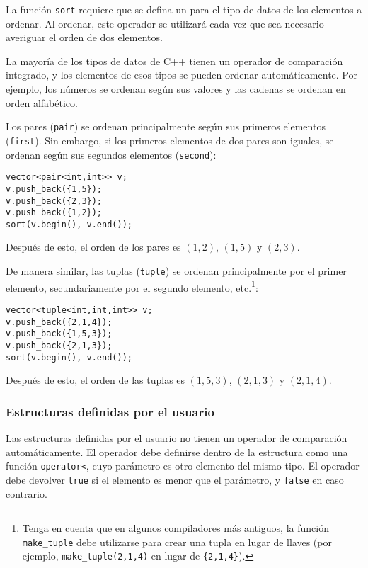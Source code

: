 
La función \texttt{sort} requiere que
se defina un  para el tipo de datos
de los elementos a ordenar.
Al ordenar, este operador se utilizará
cada vez que sea necesario averiguar el orden de dos elementos.

La mayoría de los tipos de datos de C++ tienen un operador de comparación integrado,
y los elementos de esos tipos se pueden ordenar automáticamente.
Por ejemplo, los números se ordenan según sus valores
y las cadenas se ordenan en orden alfabético.


Los pares (\texttt{pair}) se ordenan principalmente según sus
primeros elementos (\texttt{first}).
Sin embargo, si los primeros elementos de dos pares son iguales,
se ordenan según sus segundos elementos (\texttt{second}):
\begin{lstlisting}
vector<pair<int,int>> v;
v.push_back({1,5});
v.push_back({2,3});
v.push_back({1,2});
sort(v.begin(), v.end());
\end{lstlisting}
Después de esto, el orden de los pares es
$(1,2)$, $(1,5)$ y $(2,3)$.


De manera similar, las tuplas (\texttt{tuple})
se ordenan principalmente por el primer elemento,
secundariamente por el segundo elemento, etc.\footnote{Tenga en cuenta que en algunos compiladores más antiguos,
la función \texttt{make\_tuple} debe utilizarse para crear una tupla en lugar de
llaves (por ejemplo, \texttt{make\_tuple(2,1,4)} en lugar de \texttt{\{2,1,4\}}).}:
\begin{lstlisting}
vector<tuple<int,int,int>> v;
v.push_back({2,1,4});
v.push_back({1,5,3});
v.push_back({2,1,3});
sort(v.begin(), v.end());
\end{lstlisting}
Después de esto, el orden de las tuplas es
$(1,5,3)$, $(2,1,3)$ y $(2,1,4)$.

\subsubsection{Estructuras definidas por el usuario}

Las estructuras definidas por el usuario no tienen un operador de comparación
automáticamente.
El operador debe definirse dentro
de la estructura como una función
\texttt{operator<},
cuyo parámetro es otro elemento del mismo tipo.
El operador debe devolver \texttt{true}
si el elemento es menor que el parámetro,
y \texttt{false} en caso contrario.

